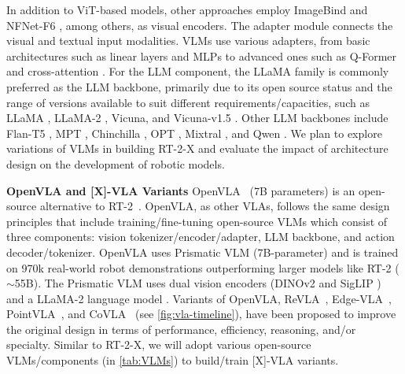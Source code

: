 In addition to ViT-based models, other approaches employ ImageBind \cite{girdhar2023imagebind} and NFNet-F6 \cite{brock2021high}, among others, as visual encoders.
The adapter module connects the visual and textual input modalities. 
VLMs use various adapters, from basic architectures such as linear layers and MLPs to advanced ones such as Q-Former \cite{li2023blip} and cross-attention \cite{vaswani2017attention}.
For the LLM component, the LLaMA family is commonly preferred as the LLM backbone, primarily due to its open source status and the range of versions available to suit different requirements/capacities, such as LLaMA \cite{touvron2023llama}, LLaMA-2 \cite{touvron2023llama2}, Vicuna, and Vicuna-v1.5 \cite{chiang2023vicuna}. 
Other LLM backbones include Flan-T5 \cite{chung2024scaling}, MPT \cite{mosaicml2023introducing}, Chinchilla \cite{hoffmann2022training}, OPT \cite{zhang2022opt}, Mixtral \cite{jiang2024mixtral}, and Qwen \cite{bai2023aqwen}. 
We plan to explore variations of VLMs in building RT-2-X and evaluate the impact of architecture design on the development of robotic models. %


\noindent\textbf{{} OpenVLA and [X]-VLA Variants} 
OpenVLA~\cite{kim2024openvla} (7B parameters)
is an open-source alternative to RT-2~\cite{rt-2}. %
OpenVLA, as other VLAs, follows the same design principles that include training/fine-tuning open-source VLMs which consist of three components: vision tokenizer/encoder/adapter, LLM backbone, and action decoder/tokenizer. 
OpenVLA uses Prismatic VLM (7B-parameter) and is trained on 970k real-world robot demonstrations outperforming larger models like RT-2 ($\sim$55B). The Prismatic VLM uses dual vision encoders (DINOv2 \cite{oquab2023dinov2} and SigLIP \cite{zhai2023sigmoid}) and a LLaMA-2 language model \cite{touvron2023llama}.
Variants of OpenVLA, \eg  ReVLA~\cite{dey2024revla}, Edge-VLA~\cite{budzianowski20edgevla}, PointVLA~\cite{li2025pointvla}, and CoVLA~\cite{arai2025covla} (see \autoref{fig:vla-timeline}), have been proposed to improve the original design in terms of performance, efficiency, reasoning, and/or specialty.
Similar to RT-2-X, we will adopt various open-source VLMs/components (in \autoref{tab:VLMs}) to build/train [X]-VLA variants.


